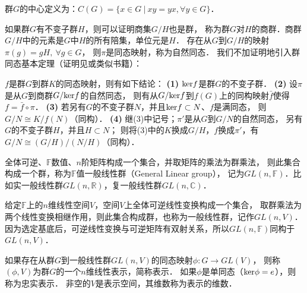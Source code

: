      

\begin{definition}\label{chtop:def_center}
    群$G$的{\heiti 中心}定义为：$C(G)=\{x\in G\ |\ xy=yx, \forall y\in G\}$．
\end{definition}

如果群$G$有不变子群$H$，则可以证明\cite[\S 1.3]{mengdj-cxds-1}商集$G/H$也是群，
称为群$G$对$H$的{\heiti 商群}．商群$G/H$中的元素是$G$中$H$的所有陪集，单位元是$H$．
存在从$G$到$G/H$的映射$\boxed{\pi (g)= gH,\ \forall g\in G}$，
则$\pi$是同态映射，称为{\heiti 自然同态}．
我们不加证明地引入群同态基本定理（证明见\parencite[\S 1.7]{mengdj-cxds-1}或类似书籍）：

\begin{theorem}\label{chtop:thm_ghk}
    $f$是群$G$到群$K$的同态映射，则有如下结论：
    {\bfseries (1)} ${\rm ker}f$是群$G$的不变子群．
    {\bfseries (2)} 设$\pi$是从$G$到商群$G/{\rm ker}f$的自然同态，
    则有从$G/{\rm ker}f$到$f(G)$上的同构映射$\bar{f}$使得$f=\bar{f}\circ \pi$．
    {\bfseries (3)} 若另有$G$的不变子群$N$，并且${\rm ker}f\subset N$、$f$是满同态，
    则$G/N \cong K/f(N)$（同构）．
    {\bfseries (4)}  继(3)中记号；$\pi'$是从$G$到$G/N$的自然同态，
    另有$G$的不变子群$H$，并且$H\subset N$；
    则将(3)中的$K$换成$G/H$，$f$换成$\pi'$，有$G/N \cong (G/H)/(N/H)$（同构）．
\end{theorem}

    
\begin{example}
    全体可逆、$\mathbb{F}$数值、$n$阶矩阵构成一个集合，并取矩阵的乘法为群乘法，
    则此集合构成一个群，称为$\mathbb{F}$值{\heiti 一般线性群}（General Linear group），
    记为$GL(n,\mathbb{F})$．比如实一般线性群$GL(n,\mathbb{R})$，复一般线性群$GL(n,\mathbb{C})$．
\end{example}

\begin{example}
    给定$\mathbb{F}$上的$n$维线性空间$V$，空间$V$上全体可逆线性变换构成一个集合，
    取群乘法为两个线性变换相继作用，则此集合构成群，也称为{\heiti 一般线性群}，记作$GL(n,V)$．
    因为选定基底后，可逆线性变换与可逆矩阵有双射关系，所以$GL(n,\mathbb{F})$同构于$GL(n,V)$．
\end{example}


\begin{definition}\label{chtop:def_group_representation}
    如果存在从群$G$到一般线性群$GL(n,V)$的同态映射$\phi:G\to GL(V)$，
    则称$(\phi,V)$为群$G$的一个$n$维{\heiti 线性表示}，简称{\heiti 表示}． 
    如果$\phi$是单同态（${\rm ker} \phi={e}$），则称为{\heiti  忠实表示}．
    非空的$V$是表示空间，其维数称为表示的{\heiti 维数}．
\end{definition}
    
